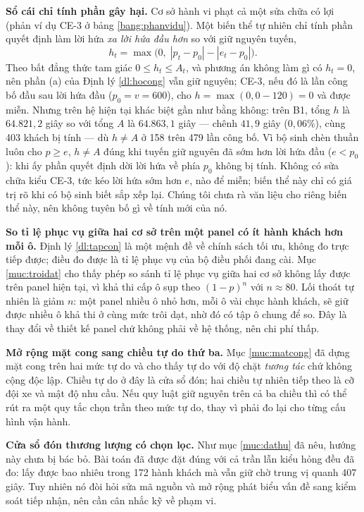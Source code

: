 \textbf{Sổ cái chỉ tính phần gây hại.} Cơ sở hành vi phạt cả một sửa chữa có lợi (phản ví dụ CE-3
ở bảng \ref{bang:phanvidu}). Một biến thể tự nhiên chỉ tính phần quyết định làm lời hứa \emph{xa
lời hứa đầu hơn} so với giữ nguyên tuyến,
\[
h_t = \max\big(0,\; |p_t - p_0| - |e_t - p_0|\big).
\]
Theo bất đẳng thức tam giác $0 \le h_t \le A_t$, và phương án không làm gì có $h_t = 0$, nên phần
(a) của Định lý \ref{dl:hocong} vẫn giữ nguyên; CE-3, nếu đó là lần công bố đầu sau lời hứa đầu
($p_0 = v = 600$), cho $h = \max(0, 0 - 120) = 0$ và được miễn. Nhưng trên hệ hiện tại khác biệt
gần như bằng không: trên B1, tổng $h$ là $64.821{,}2$ giây so với tổng $A$ là $64.863{,}1$ giây ---
chênh $41{,}9$ giây ($0{,}06\%$), cùng 403 khách bị tính --- dù $h \ne A$ ở 158 trên 479 lần công
bố. Vì bộ sinh chèn thuần luôn cho $p \ge e$, $h \ne A$ đúng khi tuyến giữ nguyên đã sớm hơn lời
hứa đầu ($e < p_0$): khi ấy phần quyết định dời lời hứa về phía $p_0$ không bị tính. Không
có sửa chữa kiểu CE-3, tức kéo lời hứa sớm hơn $e$, nào để miễn; biến thể này chỉ có giá trị rõ khi
có bộ sinh biết sắp xếp lại. Chúng tôi chưa rà văn liệu cho riêng biến thể này, nên không tuyên bố
gì về tính mới của nó.

\textbf{So tỉ lệ phục vụ giữa hai cơ sở trên một panel có ít hành khách hơn mỗi ô.} Định lý
\ref{dl:tapcon} là một mệnh đề về chính sách tối ưu, không đo trực tiếp được; điều đo được là tỉ lệ
phục vụ của bộ điều phối đang cài. Mục \ref{muc:troidat} cho thấy phép so
sánh tỉ lệ phục vụ giữa hai cơ sở không lấy được trên panel hiện tại, vì khả thi cấp ô sụp theo
$(1-p)^{n}$ với $n \approx 80$. Lối thoát tự nhiên là giảm $n$: một panel nhiều ô nhỏ hơn, mỗi
ô vài chục hành khách, sẽ giữ được nhiều ô khả thi ở cùng mức trôi dạt, nhờ đó có tập ô chung
để so. Đây là thay đổi về thiết kế panel chứ không phải về hệ thống, nên chi phí thấp.

\textbf{Mở rộng mặt cong sang chiều tự do thứ ba.} Mục \ref{muc:matcong} đã dựng mặt cong trên hai mức tự
do và cho thấy tự do với độ chặt \emph{tương tác} chứ không cộng độc lập. Chiều tự do ở đây là
cửa sổ đón; hai chiều tự nhiên tiếp theo là cỡ đội xe và mật độ nhu cầu. Nếu quy luật giữ nguyên
trên cả ba chiều thì có thể rút ra một quy tắc chọn trần theo mức tự do, thay vì phải đo lại cho
từng cấu hình vận hành.

\textbf{Cửa sổ đón thương lượng có chọn lọc.} Như mục \ref{muc:dathu} đã nêu, hướng này chưa bị bác bỏ. Bài
toán đã được đặt đúng với cả trần lẫn kiểu hỏng đều đã đo: lấy được bao nhiêu trong 172 hành
khách mà vẫn giữ chờ trung vị quanh 407 giây. Tuy nhiên nó đòi hỏi sửa mã nguồn và mở rộng phát
biểu vấn đề sang kiểm soát tiếp nhận, nên cần cân nhắc kỹ về phạm vi.

